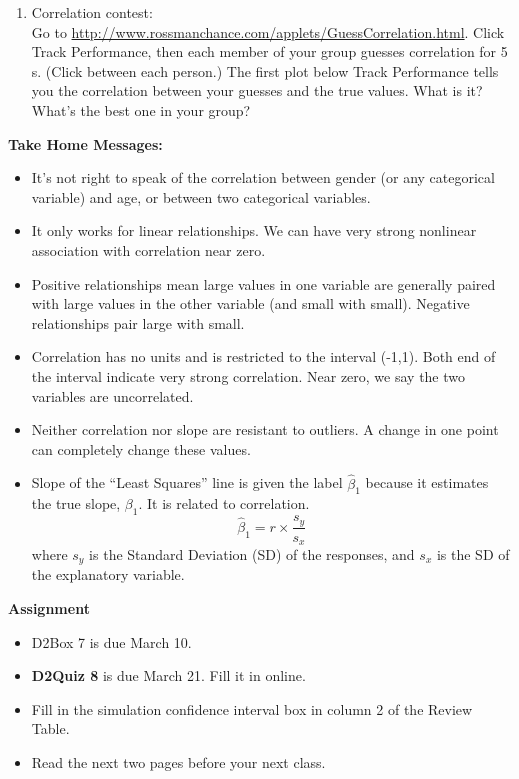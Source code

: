 \begin{enumerate}
\item Correlation contest:\\
  Go to
  \url{http://www.rossmanchance.com/applets/GuessCorrelation.html}.
  Click \fbox{$\surd$} {\sf Track Performance}, then each member of your
  group guesses correlation for 5 s. (Click  between each person.)  The first plot
  below {\sf Track Performance} tells you the correlation between your
  guesses and the true values.  What  is it? What's the best one in
  your group? 
\begin{students} 
\vspace{1cm}
\end{students}



\end{enumerate}

\begin{center}
  {\bf Take Home Messages:}\vspace{-.4cm}
\end{center}
\begin{itemize}
\item It's not right to speak of the correlation between gender (or any
  categorical variable) and age, or between two categorical variables.
\item It only works for linear relationships.  We can have very strong
  nonlinear association with correlation near zero.
\item Positive relationships mean large values in one variable are
  generally  paired  with large values  in  the other variable
  (and small with small).  Negative relationships pair large with small.
\item Correlation has no units and is restricted to the interval
  (-1,1). Both end of the interval indicate very strong
  correlation. Near zero, we say the two variables are uncorrelated.

\item Neither correlation nor slope are resistant to outliers.  A
  change in one point can completely change these values.
\item Slope of the ``Least Squares'' line is given the label
  $\hat{\beta}_1$ because it estimates the true slope, $\beta_1$.  It is
  related to correlation.  
  $$  \hat{\beta}_1 = r \times\frac{s_y}{s_x}$$
  where $s_y$ is the Standard Deviation (SD) of the responses, and $s_x$ is
  the SD of the explanatory variable.
\end{itemize}




\noindent
{\bf Assignment} \vspace{-.2in}
\begin{itemize}
\item  D2Box 7 is due March 10.
\item {\bf D2Quiz 8} is due March 21.  Fill it in online.
\item Fill in the simulation confidence interval box in column 2 of
  the Review Table.
\item Read the next two pages before your next class.
\end{itemize}

